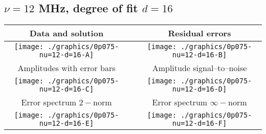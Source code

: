 

% 

\clearpage{}
\break{}

\subsection{$\nu = 12$ MHz, degree of fit $d = 16$}

\begin{table}[h]
    \begin{center}
        \begin{tabular}{ccc}
            Data and solution & \quad & Residual errors \\\hline
            \texttt{[image: ./graphics/0p075-nu=12-d=16-A]} &&
            \texttt{[image: ./graphics/0p075-nu=12-d=16-B]} \\[15pt]
            Amplitudes with error bars && Amplitude signal--to--noise \\\hline
            \texttt{[image: ./graphics/0p075-nu=12-d=16-C]} &&
            \texttt{[image: ./graphics/0p075-nu=12-d=16-D]} \\[15pt]
            Error spectrum $2-$norm && Error spectrum $\infty-$norm \\\hline
            \texttt{[image: ./graphics/0p075-nu=12-d=16-E]} &&
            \texttt{[image: ./graphics/0p075-nu=12-d=16-F]} \\[15pt]
        \end{tabular}
    \end{center}
\label{fig:elev=75, nu=12}
\end{table}



\endinput
